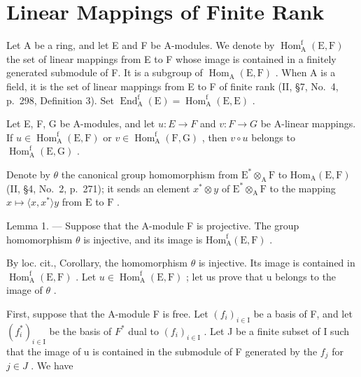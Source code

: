 \section{Linear Mappings of Finite Rank}

Let A be a ring, and let E and F be A-modules. We denote by \(\operatorname{Hom}_{\mathrm{A}}^{\mathrm{f}}(\mathrm{E},\mathrm{F})\) the set of linear mappings from E to F whose image is contained in a finitely generated submodule of F. It is a subgroup of \(\operatorname{Hom}_{\mathrm{A}}(\mathrm{E},\mathrm{F})\) . When A is a field, it is the set of linear mappings from E to F of finite rank (II, §7, No.~4, p.~298, Definition 3). Set \(\operatorname{End}_{\mathrm{A}}^{\mathrm{f}}(\mathrm{E}) = \operatorname{Hom}_{\mathrm{A}}^{\mathrm{f}}(\mathrm{E},\mathrm{E})\) .

Let E, F, G be A-modules, and let \(u : E \to F\) and \(v : F \to G\) be A-linear mappings. If \(u \in \operatorname{Hom}_{\mathrm{A}}^{\mathrm{f}}(\mathrm{E}, \mathrm{F})\) or \(v \in \operatorname{Hom}_{\mathrm{A}}^{\mathrm{f}}(\mathrm{F}, \mathrm{G})\) , then \(v \circ u\) belongs to \(\operatorname{Hom}_{\mathrm{A}}^{\mathrm{f}}(\mathrm{E}, \mathrm{G})\) .

Denote by \(\theta\) the canonical group homomorphism from \(\mathrm{E}^* \otimes_{\mathrm{A}} \mathrm{F}\) to \(\mathrm{Hom}_{\mathrm{A}}(\mathrm{E}, \mathrm{F})\) (II, §4, No.~2, p.~271); it sends an element \(x^* \otimes y\) of \(\mathrm{E}^* \otimes_{\mathrm{A}} \mathrm{F}\) to the mapping \(x \mapsto \langle x, x^* \rangle y\) from \(\mathrm{E}\) to \(\mathrm{F}\) .

Lemma 1. --- Suppose that the A-module F is projective. The group homomorphism \(\theta\) is injective, and its image is \(\mathrm{Hom}_{\mathrm{A}}^{\mathrm{f}}(\mathrm{E},\mathrm{F})\) .

By loc. cit., Corollary, the homomorphism \(\theta\) is injective. Its image is contained in \(\operatorname{Hom}_{\mathrm{A}}^{\mathrm{f}}(\mathrm{E},\mathrm{F})\) . Let \(u \in \operatorname{Hom}_{\mathrm{A}}^{\mathrm{f}}(\mathrm{E},\mathrm{F})\) ; let us prove that u belongs to the image of \(\theta\) .

First, suppose that the A-module F is free. Let \((f_{i})_{i\in\mathrm{I}}\) be a basis of F, and let \((f_{i}^{*})_{i\in\mathrm{I}}\) be the basis of \(F^{*}\) dual to \((f_{i})_{i\in\mathrm{I}}\) . Let J be a finite subset of I such that the image of u is contained in the submodule of F generated by the \(f_{j}\) for \(j\in J\) . We have

